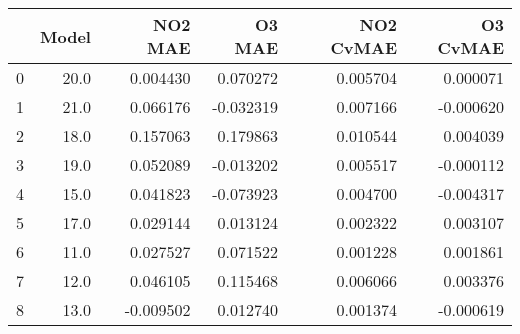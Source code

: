 \begin{tabular}{lrrrrr}
\toprule
{} &  Model &   NO2 MAE &    O3 MAE &  NO2 CvMAE &  O3 CvMAE \\
\midrule
0 &   20.0 &  0.004430 &  0.070272 &   0.005704 &  0.000071 \\
1 &   21.0 &  0.066176 & -0.032319 &   0.007166 & -0.000620 \\
2 &   18.0 &  0.157063 &  0.179863 &   0.010544 &  0.004039 \\
3 &   19.0 &  0.052089 & -0.013202 &   0.005517 & -0.000112 \\
4 &   15.0 &  0.041823 & -0.073923 &   0.004700 & -0.004317 \\
5 &   17.0 &  0.029144 &  0.013124 &   0.002322 &  0.003107 \\
6 &   11.0 &  0.027527 &  0.071522 &   0.001228 &  0.001861 \\
7 &   12.0 &  0.046105 &  0.115468 &   0.006066 &  0.003376 \\
8 &   13.0 & -0.009502 &  0.012740 &   0.001374 & -0.000619 \\
\bottomrule
\end{tabular}
